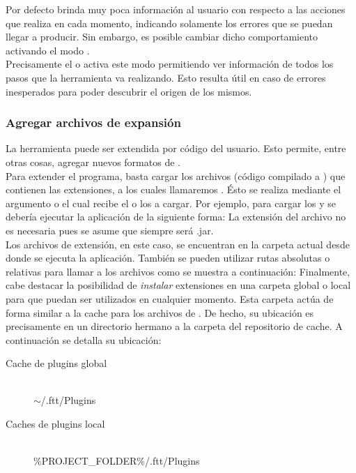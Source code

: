 Por defecto \fronttier brinda muy poca información al usuario con respecto a
las acciones que realiza en cada momento, indicando solamente los errores que 
se puedan llegar a producir. Sin embargo, es posible cambiar dicho 
comportamiento activando el modo .\\
Precisamente el \flag {} o  activa este modo 
permitiendo ver información de todos los pasos que la herramienta va 
realizando. Esto resulta útil en caso de errores inesperados para poder 
descubrir el origen de los mismos.\\


\subsubsection{Agregar archivos de expansión}
\label{subsubsec:guide:expand}

La herramienta \fronttier puede ser extendida por código del usuario. Esto 
permite, entre otras cosas, agregar nuevos formatos de \conffile.\\
Para extender el programa, basta cargar los archivos \jar (código compilado a
\bytecode \java) que contienen las extensiones, a los cuales llamaremos 
\plugins. Ésto se realiza mediante el argumento  o  
el cual recibe el o los \plugins a cargar. Por ejemplo, para cargar los 
\plugins {} y  se debería ejecutar la 
aplicación de la siguiente forma:
La extensión del archivo no es necesaria pues se asume que siempre será .jar.\\
Los archivos de extensión, en este caso, se encuentran en la carpeta actual
desde donde se ejecuta la aplicación. También se pueden utilizar rutas
absolutas o relativas para llamar a los archivos como se muestra a continuación:
Finalmente, cabe destacar la posibilidad de \emph{instalar} extensiones en
una carpeta global o local para que puedan ser utilizados en cualquier
momento. Esta carpeta actúa de forma similar a la cache para los archivos
de \dependency. De hecho, su ubicación es precisamente en un directorio hermano
a la carpeta del repositorio de cache. A continuación se detalla su ubicación:

\begin{description}
	\item[Cache de plugins global] \hfill \\
	$\sim$/.ftt/Plugins
	\item[Caches de plugins local] \hfill \\
	\%PROJECT\_FOLDER\%/.ftt/Plugins
\end{description}

